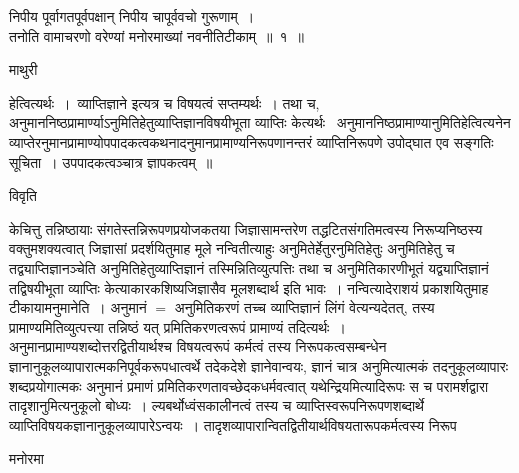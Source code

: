 \documentclass[10pt, openany]{book}
\makeatletter
\newcommand{\devanagarinumeral}[1]{%
	\devanagaridigits{\number \csname c@#1\endcsname}}
\renewcommand{\headrulewidth}{0pt}
\makeatother
\begin{document}
{निपीय पूर्वागतपूर्वपक्षान् निपीय चापूर्ववचो गुरूणाम्~।\\
\indent तनोति {\la वामाचरणो} वरेण्यां {\la मनोरमाख्यां} नवनीतिटीकाम्~॥~१~॥~
\newpage
\fancyhead[LE]{\thepage}
\renewcommand{\thepage}{\devanagarinumeral{page}}
\setcounter{page}{2}
\begin{center}  माथुरी  \end{center}
\renewcommand{\headrulewidth}{1pt}
\noindent
{\la हेत्वित्यर्थः~।~व्याप्तिज्ञाने इत्यत्र च विषयत्वं सप्तम्यर्थः~। तथा च, अनुमाननिष्ठप्रामार्ण्याऽनुमितिहेतुव्याप्तिज्ञानविषयीभूता व्याप्तिः केत्यर्थः~ अनुमाननिष्ठप्रामाण्यानुमितिहेत्वित्यनेन व्याप्तेरनुमानप्रामाण्योपपादकत्वकथनादनुमानप्रामाण्यनिरूपणानन्तरं व्याप्तिनिरूपणे उपोद्घात एव सङ्गतिः सूचिता~। उपपादकत्वञ्चात्र ज्ञापकत्वम्~॥}
\begin{center}  विवृति  \end{center}

{\la केचित्तु} तन्निष्ठायाः संगतेस्तन्निरूपणप्रयोजकतया जिज्ञासामन्तरेण तद्धटितसंगतिमत्वस्य निरूप्यनिष्ठस्य वक्तुमशक्यत्वात् जिज्ञासां प्रदर्शयितुमाह\textendash
मूले नन्वितीत्याहुः अनुमितेर्हेतुरनुमितिहेतुः अनुमितिहेतु च तद्व्याप्तिज्ञानञ्चेति अनुमितिहेतुव्याप्तिज्ञानं तस्मिन्नितिव्युत्पत्तिः तथा च अनुमितिकारणीभूतं
यद्व्याप्तिज्ञानं तद्विषयीभूता व्याप्तिः केत्याकारकशिष्यजिज्ञासैव मूलशब्दार्थ इति भावः~। नन्वित्यादेराशयं प्रकाशयितुमाह टीकायामनुमानेति~। अनुमानं $=$ अनुमितिकरणं तच्च व्याप्तिज्ञानं लिंगं वेत्यन्यदेतत्, तस्य प्रामाण्यमितिव्युत्पत्त्या तन्निष्ठं यत् प्रमितिकरणत्वरूपं प्रामाण्यं तदित्यर्थः~। अनुमानप्रामाण्यशब्दोत्तरद्वितीयार्थश्च विषयत्वरूपं कर्मत्वं तस्य निरूपकत्वसम्बन्धेन ज्ञानानुकूलव्यापारात्मकनिपूर्वकरूपधात्वर्थे तदेकदेशे ज्ञानेवान्वयः,  ज्ञानं चात्र अनुमित्यात्मकं तदनुकूलव्यापारः शब्दप्रयोगात्मकः अनुमानं प्रमाणं प्रमितिकरणतावच्छेदकधर्मवत्वात् यथेन्द्रियमित्यादिरूपः स च परामर्शद्वारा तादृशानुमित्यनुकूलो बोध्यः~। ल्यबर्थोध्वंसकालीनत्वं तस्य च व्याप्तिस्वरूपनिरूपणशब्दार्थे
व्याप्तिविषयकज्ञानानुकूलव्यापारेऽन्वयः~। तादृशव्यापारान्वितद्वितीयार्थविषयतारूपकर्मत्वस्य
निरूप
\begin{center}   मनोरमा  \end{center}

}
\end{document}
